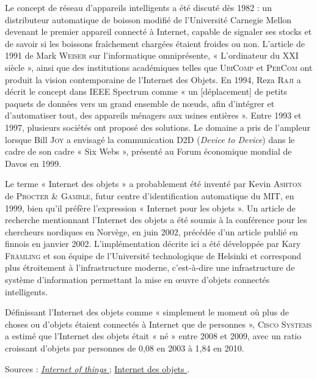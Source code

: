 Le concept de réseau d'appareils intelligents a été discuté dès 1982 : un distributeur automatique de boisson modifié de l'Université Carnegie Mellon devenant le premier appareil connecté à Internet, capable de signaler ses stocks et de savoir si les boissons fraîchement chargées étaient froides ou non. L'article de 1991 de Mark \textsc{Weiser} sur l'informatique omniprésente, « L'ordinateur du XXI siècle », ainsi que des institutions académiques telles que \textsc{UbiComp} et \textsc{PerCom} ont produit la vision contemporaine de l'Internet des Objets. En 1994, Reza \textsc{Raji} a décrit le concept dans IEEE Spectrum comme « un [déplacement] de petits paquets de données vers un grand ensemble de nœuds, afin d'intégrer et d'automatiser tout, des appareils ménagers aux usines entières ». Entre 1993 et ​​1997, plusieurs sociétés ont proposé des solutions. Le domaine a pris de l'ampleur lorsque Bill \textsc{Joy} a envisagé la communication D2D (\textit{Device to Device}) dans le cadre de son cadre « Six Webs », présenté au Forum économique mondial de Davos en 1999.

Le terme « Internet des objets » a probablement été inventé par Kevin \textsc{Ashton} de \textsc{Procter \& Gamble}, futur centre d'identification automatique du MIT, en 1999, bien qu'il préfère l'expression « Internet pour les objets ». Un article de recherche mentionnant l'Internet des objets a été soumis à la conférence pour les chercheurs nordiques en Norvège, en juin 2002, précédée d'un article publié en finnois en janvier 2002. L’implémentation décrite ici a été développée par Kary \textsc{Främling} et son équipe de l’Université technologique de Helsinki et correspond plus étroitement à l’infrastructure moderne, c’est-à-dire une infrastructure de système d’information permettant la mise en œuvre d’objets connectés intelligents.

Définissant l'Internet des objets comme « simplement le moment où plus de choses ou d'objets étaient connectés à Internet que de personnes », \textsc{Cisco Systems} a estimé que l'Internet des objets était « né » entre 2008 et 2009, avec un ratio croissant d'objets par personnes de 0,08 en 2003 à 1,84 en 2010.

\noindent Sources : 
\href{https://en.wikipedia.org/wiki/Internet_of_things}{\textit{Internet of things} \faWikipediaW} ;
\href{https://fr.wikipedia.org/wiki/Internet_des_objets}{Internet des objets \faWikipediaW}.


